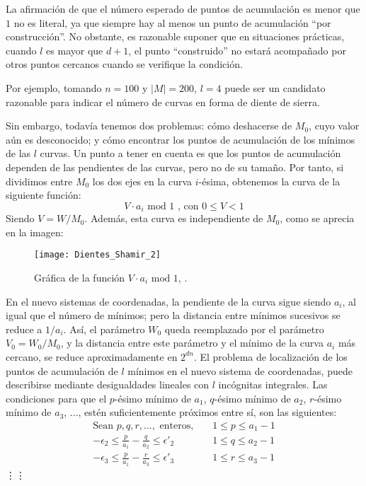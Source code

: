     La afirmación de que el número esperado de puntos de acumulación es menor que $1$ no es literal, ya que siempre hay al menos un punto de acumulación ``por construcción''. No obstante, es razonable suponer que en situaciones prácticas, cuando $l$ es mayor que $d + 1$, el punto ``construido'' no estará acompañado por otros puntos cercanos cuando se verifique la condición.

    \begin{ejemplo} \cite{artSha}
        Por ejemplo, tomando $n = 100$ y $|M| = 200$, $l = 4$ puede ser un candidato razonable para indicar el número de curvas en forma de diente de sierra.
    \end{ejemplo}

    Sin embargo, todavía tenemos dos problemas: cómo deshacerse de $M_{0}$, cuyo valor aún es desconocido; y cómo encontrar los puntos de acumulación de los mínimos de las $l$ curvas. Un punto a tener en cuenta es que los puntos de acumulación dependen de las pendientes de las curvas, pero no de su tamaño. Por tanto, si dividimos entre $M_{0}$ los dos ejes en la curva $i$-ésima, obtenemos la curva de la siguiente función:
    \begin{equation}
        V \cdot a_{i} \text{ mod } 1 \text{ , con } 0 \leq V < 1
    \end{equation}
    Siendo $V = W/M_{0}$. Además, esta curva es independiente de $M_{0}$, como se aprecia en la imagen:

    \begin{figure}[H]
        \centering
        \texttt{[image: Dientes\_Shamir\_2]}
        \caption{Gráfica de la función $V \cdot a_{i} \text{ mod } 1$, \cite{artSha}.}
    \end{figure}

    En el nuevo sistemas de coordenadas, la pendiente de la curva sigue siendo $a_{i}$, al igual que el número de mínimos; pero la distancia entre mínimos sucesivos se reduce a $1/a_{i}$. Así, el parámetro $W_{0}$ queda reemplazado por el parámetro $V_{0} = W_{0}/M_{0}$, y la distancia entre este parámetro y el mínimo de la curva $a_{i}$ más cercano, se reduce aproximadamente en $2^{dn}$. El problema de localización de los puntos de acumulación de $l$ mínimos en el nuevo sistema de coordenadas, puede describirse mediante desigualdades lineales con $l$ incógnitas integrales. Las condiciones para que el $p$-ésimo mínimo de $a_{1}$, $q$-ésimo mínimo de $a_{2}$, $r$-ésimo mínimo de $a_{3}$, ..., estén suficientemente próximos entre sí, son las siguientes:
    \begin{align}
        \text{Sean } p,q,r, ... , \text{ enteros, } &&1 \leq p \leq a_{1} - 1 \\
        -\epsilon_{2} \leq \frac{p}{a_{1}}-\frac{q}{a_{2}} \leq \epsilon'_{2} &&1 \leq q \leq a_{2} - 1 \\
        -\epsilon_{3} \leq \frac{p}{a_{1}}-\frac{r}{a_{3}} \leq \epsilon'_{3} &&1 \leq r \leq a_{3} - 1
    \end{align}
    \hspace{5cm}\vdots\hspace{5cm}\vdots
    
